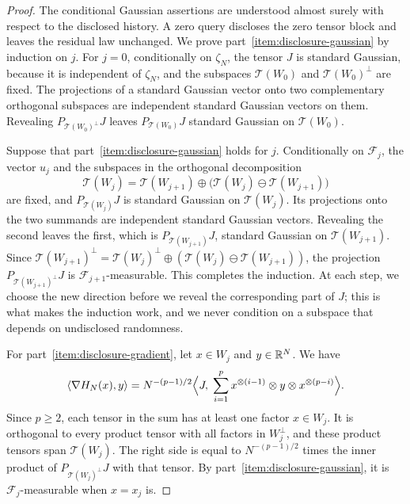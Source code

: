 \begin{proof}
The conditional Gaussian assertions are understood almost surely with respect to the disclosed history. A zero query discloses the zero tensor block and leaves the residual law unchanged.
We prove part~\ref{item:disclosure-gaussian} by induction on $j$. For
$j=0$, conditionally on $\zeta_N$, the tensor $J$ is standard Gaussian,
because it is independent of $\zeta_N$, and the subspaces $\mathcal T(W_0)$
and $\mathcal T(W_0)^\perp$ are fixed. The projections of a standard
Gaussian vector onto two complementary orthogonal subspaces are independent
standard Gaussian vectors on them. Revealing $P_{\mathcal T(W_0)^\perp}J$
leaves $P_{\mathcal T(W_0)}J$ standard Gaussian on
$\mathcal T(W_0)$.

Suppose that part~\ref{item:disclosure-gaussian} holds for $j$. Conditionally on
$\mathcal F_j$, the vector $u_j$ and the subspaces in the orthogonal
decomposition
\[
 \mathcal T(W_j)=\mathcal T(W_{j+1})\oplus
 \big(\mathcal T(W_j)\ominus\mathcal T(W_{j+1})\big)
\]
are fixed, and $P_{\mathcal T(W_j)}J$ is standard Gaussian on
$\mathcal T(W_j)$. Its projections onto the two summands are
independent standard Gaussian vectors. Revealing the second leaves the
first, which is $P_{\mathcal T(W_{j+1})}J$, standard Gaussian on
$\mathcal T(W_{j+1})$. Since
$\mathcal T(W_{j+1})^\perp=\mathcal T(W_j)^\perp\oplus
(\mathcal T(W_j)\ominus\mathcal T(W_{j+1}))$, the projection
$P_{\mathcal T(W_{j+1})^\perp}J$ is $\mathcal F_{j+1}$-measurable. This
completes the induction. At each step, we choose the new direction before we reveal the
corresponding part of $J$; this is what makes the induction work, and we
never condition on a subspace that depends on undisclosed randomness.

For part~\ref{item:disclosure-gradient}, let $x\in W_j$ and $y\in\mathbb R^N$. We
have
\[
 \left\langle\nabla H_N(x),y\right\rangle=N^{-(p-1)/2}\Big\langle J,\;\sum_{i=1}^p
 x^{\otimes(i-1)}\otimes y\otimes x^{\otimes(p-i)}\Big\rangle.
\]
Since $p\ge2$, each tensor in the sum has at least one factor $x\in W_j$.
It is orthogonal to every product tensor with all factors in $W_j^\perp$,
and these product tensors span $\mathcal T(W_j)$. The right side is equal to
$N^{-(p-1)/2}$ times the inner product of $P_{\mathcal T(W_j)^\perp}J$ with
that tensor. By part~\ref{item:disclosure-gaussian}, it is
$\mathcal F_j$-measurable when $x=x_j$ is.
\end{proof}

